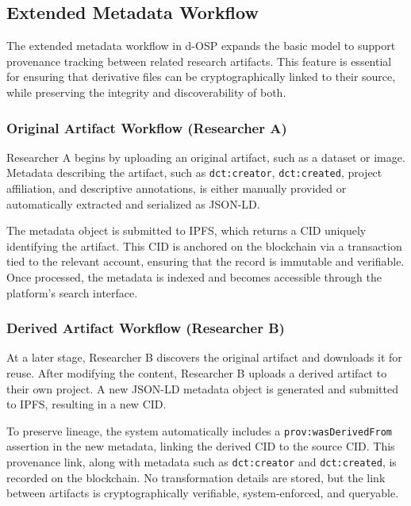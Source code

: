 \documentclass[final]{rc-book-2.14}
\begin{document}
\subsection{Extended Metadata Workflow}
\label{chp:proposed_model:sec:metadata_workflow}

The extended metadata workflow in d-OSP expands the basic model to support provenance tracking between related research artifacts. This feature is essential for ensuring that derivative files can be cryptographically linked to their source, while preserving the integrity and discoverability of both.

\subsubsection{Original Artifact Workflow (Researcher A)}

Researcher A begins by uploading an original artifact, such as a dataset or image. Metadata describing the artifact, such as \texttt{dct:creator}, \texttt{dct:created}, project affiliation, and descriptive annotations, is either manually provided or automatically extracted and serialized as JSON-LD.

The metadata object is submitted to IPFS, which returns a CID uniquely identifying the artifact. This CID is anchored on the blockchain via a transaction tied to the relevant account, ensuring that the record is immutable and verifiable. Once processed, the metadata is indexed and becomes accessible through the platform’s search interface.

\subsubsection{Derived Artifact Workflow (Researcher B)}

At a later stage, Researcher B discovers the original artifact and downloads it for reuse. After modifying the content, Researcher B uploads a derived artifact to their own project. A new JSON-LD metadata object is generated and submitted to IPFS, resulting in a new CID.

To preserve lineage, the system automatically includes a \texttt{prov:wasDerivedFrom} assertion in the new metadata, linking the derived CID to the source CID. This provenance link, along with metadata such as \texttt{dct:creator} and \texttt{dct:created}, is recorded on the blockchain. No transformation details are stored, but the link between artifacts is cryptographically verifiable, system-enforced, and queryable.
\end{document}
